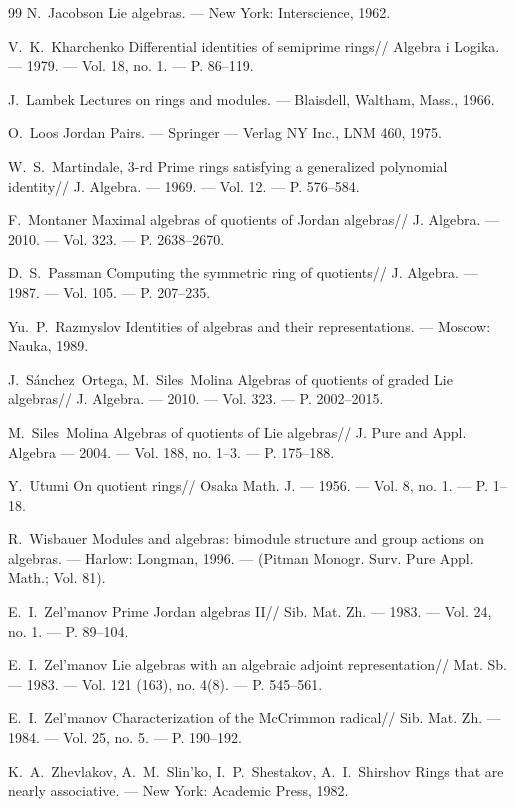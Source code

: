 \documentclass[a4paper,11pt]{article}
\begin{document}
\begin{thebibliography}{99}
 N.~Jacobson Lie algebras. --- New York: Interscience, 1962. 

 V.~K.~Kharchenko Differential identities of semiprime rings// 
Algebra i Logika. --- 1979. --- Vol. 18, no. 1. --- P. 86--119.

 J.~Lambek Lectures on rings and modules. --- Blaisdell, 
Waltham, Mass., 1966.

 O.~Loos Jordan Pairs. --- Springer --- Verlag NY Inc., LNM 460, 
1975.

 W.~S.~Martindale, 3-rd Prime rings satisfying a generalized 
polynomial identity// J. Algebra. --- 1969. --- Vol. 12. --- P. 576--584.
 
 F.~Montaner Maximal algebras of quotients of Jordan algebras// 
J. Algebra. --- 2010. --- Vol. 323. --- P. 2638--2670.

 D.~S.~Passman Computing the symmetric ring of quotients// 
J. Algebra. --- 1987. --- Vol. 105. --- P. 207--235. 

 Yu.~P.~Razmyslov Identities of algebras and their 
representations. --- Moscow: Nauka, 1989.

 J.~S\'anchez~Ortega, M.~Siles~Molina Algebras of quotients of 
graded Lie algebras// J. Algebra. --- 2010. --- Vol. 323. --- P. 2002--2015. 
         
 M.~Siles~Molina Algebras of quotients of Lie algebras// J. Pure and 
Appl. Algebra --- 2004. --- Vol. 188, no. 1--3. --- P. 175--188.
         
 Y.~Utumi On quotient rings// Osaka Math. J. --- 1956. --- 
Vol. 8, no. 1. --- P. 1--18.

 R.~Wisbauer Modules and algebras: bimodule structure and group 
actions on algebras. --- Harlow: Longman, 1996. --- (Pitman Monogr. Surv. Pure 
Appl. Math.; Vol. 81).  

 E.~I.~Zel'manov Prime Jordan algebras II// Sib. Mat. Zh. --- 
1983. --- Vol. 24, no. 1. --- P. 89--104.

 E.~I.~Zel'manov Lie algebras with an algebraic adjoint 
representation// Mat. Sb. --- 1983. --- Vol. 121 (163), no. 4(8). --- P. 545--561.

 E.~I.~Zel'manov Characterization of the McCrimmon radical// 
Sib. Mat. Zh. --- 1984. --- Vol. 25, no. 5. --- P. 190--192.

 K.~A.~Zhevlakov, A.~M.~Slin'ko, I.~P.~Shestakov, A.~I.~Shirshov 
Rings that are nearly associative. --- New York: Academic Press, 1982. 

\end{thebibliography}
\end{document}
